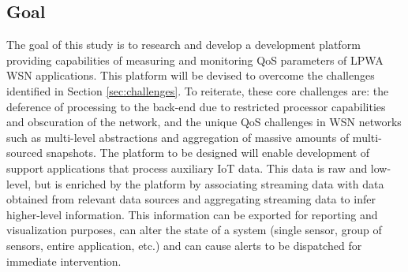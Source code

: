 \subsection{Goal}
\label{sec:goal}
The goal of this study is to research and develop a development platform providing capabilities of measuring and monitoring QoS parameters of LPWA WSN applications. This platform will be devised to overcome the challenges identified in Section \ref{sec:challenges}. To reiterate, these core challenges are: the deference of processing to the back-end due to restricted processor capabilities and obscuration of the network, and the unique QoS challenges in WSN networks such as multi-level abstractions and aggregation of massive amounts of multi-sourced snapshots. The platform to be designed will enable development of support applications that process auxiliary IoT data. This data is raw and low-level, but is enriched by the platform by associating streaming data with data obtained from relevant data sources and aggregating streaming data to infer higher-level information. This information can be exported for reporting and visualization purposes, can alter the state of a system (single sensor, group of sensors, entire application, etc.) and can cause alerts to be dispatched for immediate intervention.

